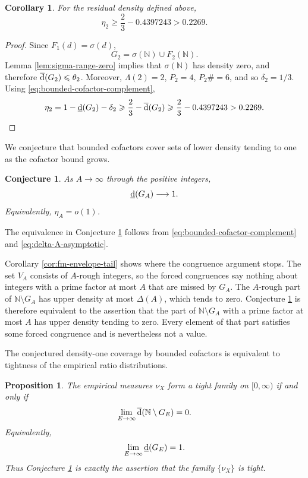 \documentclass[11pt,letterpaper,reqno]{amsart}
\numberwithin{equation}{section}
\newtheorem{proposition}[theorem]{Proposition}
\newtheorem{corollary}[theorem]{Corollary}
\newtheorem{conjecture}[theorem]{Conjecture}
\theoremstyle{remark}
\newcommand{\N}{\mathbb{N}}
\newcommand{\1}{\mathbf 1}
\newcommand{\lowerdens}{\underline{\textup{d}}}
\newcommand{\upperdens}{\overline{\textup{d}}}
\renewcommand{\leq}{\leqslant}
\renewcommand{\geq}{\geqslant}
\begin{document}
\begin{corollary}
For the residual density defined above,
\[
 \eta_2\geq\frac23-0.4397243>0.2269.
\]
\end{corollary}

\begin{proof}
Since $F_1(d)=\sigma(d)$,
\[
 G_2=\sigma(\N)\cup F_2(\N).
\]
Lemma \ref{lem:sigma-range-zero} implies that $\sigma(\N)$ has density
zero, and therefore $\upperdens(G_2)\leq\theta_2$. Moreover,
$\Lambda(2)=2$, $P_2=4$, $P_2\#=6$, and so $\delta_2=1/3$.
Using \eqref{eq:bounded-cofactor-complement},
\[
 \eta_2
 =1-\lowerdens(G_2)-\delta_2
 \geq\frac23-\upperdens(G_2)
 \geq\frac23-0.4397243>0.2269.
\]
\end{proof}

We conjecture that bounded cofactors cover sets of lower density tending to one as the cofactor bound grows.

\begin{conjecture}
\label{conj:bounded-cofactor-weak}
As $A\to\infty$ through the positive integers,
\[
 \lowerdens(G_A)\longrightarrow1.
\]
Equivalently, $\eta_A=o(1)$.
\end{conjecture}

The equivalence in Conjecture \ref{conj:bounded-cofactor-weak} follows from
\eqref{eq:bounded-cofactor-complement} and
\eqref{eq:delta-A-asymptotic}.

Corollary \ref{cor:fm-envelope-tail} shows where the congruence argument
stops. The set $V_A$ consists of $A$-rough integers, so the forced
congruences say nothing about integers with a prime factor at most $A$
that are missed by $G_A$. The $A$-rough part of $\N\setminus G_A$ has
upper density at most $\Delta(A)$, which tends to zero.
Conjecture \ref{conj:bounded-cofactor-weak} is therefore equivalent to the
assertion that the part of $\N\setminus G_A$ with a prime factor at most
$A$ has upper density tending to zero. Every element of that part satisfies some
forced congruence and is nevertheless not a value.

The conjectured density-one coverage by bounded cofactors is equivalent to tightness of the empirical ratio distributions.

\begin{proposition}
\label{prop:tightness-equivalence}
The empirical measures $\nu_X$ form a tight family on $[0,\infty)$
if and only if
\begin{equation}\label{eq:tightness-criterion}
 \lim_{E\to\infty}\upperdens(\N\setminus G_E)=0.
\end{equation}
Equivalently,
\[
 \lim_{E\to\infty}\lowerdens(G_E)=1.
\]
Thus Conjecture \ref{conj:bounded-cofactor-weak} is exactly the assertion
that the family $\{\nu_X\}$ is tight.
\end{proposition}
\end{document}
